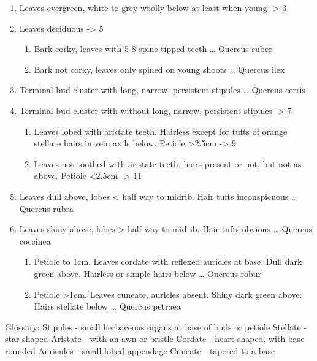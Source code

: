 \documentclass[openany]{book}
\providecommand{\tightlist}{%
  \setlength{\itemsep}{0pt}\setlength{\parskip}{0pt}}
\begin{document}
\begin{enumerate}
\def\labelenumi{\arabic{enumi}.}
\tightlist
\item
  Leaves evergreen, white to grey woolly below at least when young
  -\textgreater{} 3
\item
  Leaves deciduous -\textgreater{} 5

  \begin{enumerate}
  \def\labelenumii{\arabic{enumii}.}
  \setcounter{enumii}{2}
  \tightlist
  \item
    Bark corky, leaves with 5-8 spine tipped teeth \ldots{} Quercus
    suber
  \item
    Bark not corky, leaves only spined on young shoots \ldots{} Quercus
    ilex
  \end{enumerate}
\item
  Terminal bud cluster with long, narrow, persistent stipules \ldots{}
  Quercus cerris
\item
  Terminal bud cluster with without long, narrow, persistent stipules
  -\textgreater{} 7

  \begin{enumerate}
  \def\labelenumii{\arabic{enumii}.}
  \setcounter{enumii}{6}
  \tightlist
  \item
    Leaves lobed with aristate teeth. Hairless except for tufts of
    orange stellate hairs in vein axils below. Petiole
    \textgreater{}2.5cm -\textgreater{} 9
  \item
    Leaves not toothed with aristate teeth. hairs present or not, but
    not as above. Petiole \textless{}2.5cm -\textgreater{} 11
  \end{enumerate}
\item
  Leaves dull above, lobes \textless{} half way to midrib. Hair tufts
  inconspicuous \ldots{} Quercus rubra
\item
  Leaves shiny above, lobes \textgreater{} half way to midrib. Hair
  tufts obvious \ldots{} Quercus coccinea

  \begin{enumerate}
  \def\labelenumii{\arabic{enumii}.}
  \setcounter{enumii}{10}
  \tightlist
  \item
    Petiole to 1cm. Leaves cordate with reflexed auricles at base. Dull
    dark green above. Hairless or simple hairs below \ldots{} Quercus
    robur
  \item
    Petiole \textgreater{}1cm. Leaves cuneate, auricles absent. Shiny
    dark green above. Hairs stellate below \ldots{} Quercus petraea
  \end{enumerate}
\end{enumerate}

Glossary: Stipules - small herbaceous organs at base of buds or petiole
Stellate - star shaped Aristate - with an awn or bristle Cordate - heart
shaped, with base rounded Auricules - small lobed appendage Cuneate -
tapered to a base


\end{document}
